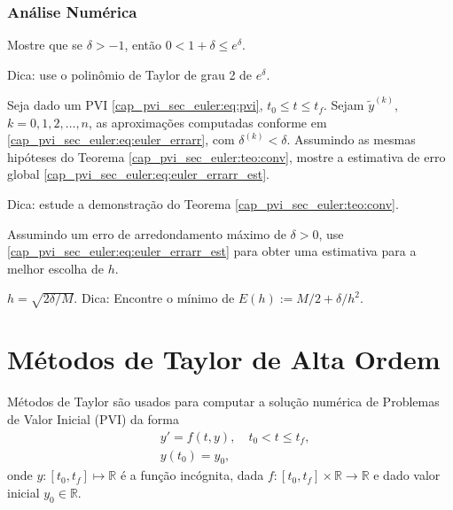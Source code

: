 \subsubsection{Análise Numérica}

\begin{exer}
  Mostre que se $\delta>-1$, então $0 < 1+\delta \leq e^{\delta}$.
\end{exer}
\begin{resp}
  Dica: use o polinômio de Taylor de grau 2 de $e^\delta$.
\end{resp}

\begin{exer}
  Seja dado um PVI \eqref{cap_pvi_sec_euler:eq:pvi}, $t_0\leq t \leq t_f$. Sejam $\tilde{y}^{(k)}$, $k=0, 1, 2, \dotsc, n$, as aproximações computadas conforme em \eqref{cap_pvi_sec_euler:eq:euler_errarr}, com $\delta^{(k)} < \delta$. Assumindo as mesmas hipóteses do Teorema \ref{cap_pvi_sec_euler:teo:conv}, mostre a estimativa de erro global \eqref{cap_pvi_sec_euler:eq:euler_errarr_est}.
\end{exer}
\begin{resp}
  Dica: estude a demonstração do Teorema \ref{cap_pvi_sec_euler:teo:conv}.
\end{resp}

\begin{exer}
  Assumindo um erro de arredondamento máximo de $\delta > 0$, use \eqref{cap_pvi_sec_euler:eq:euler_errarr_est} para obter uma estimativa para a melhor escolha de $h$.
\end{exer}
\begin{resp}
  $h = \sqrt{2\delta/M}$. Dica: Encontre o mínimo de $E(h) := M/2 + \delta/h^2$.
\end{resp}

\section{Métodos de Taylor de Alta Ordem}\label{cap_pvi_sec_taylor}

Métodos de Taylor{\taylor} são usados para computar a solução numérica de Problemas de Valor Inicial (PVI) da forma
\begin{subequations}\label{cap_pvi_sec_taylor:eq:pvi}
  \begin{align}
    &y' = f(t, y),\quad t_0 < t \leq t_f,\\
    &y(t_0) = y_0,
  \end{align}
\end{subequations}
onde $y:[t_0, t_f]\mapsto \mathbb{R}$ é a função incógnita, dada $f:[t_0, t_f]\times\mathbb{R}\to\mathbb{R}$ e dado valor inicial $y_0\in\mathbb{R}$.

